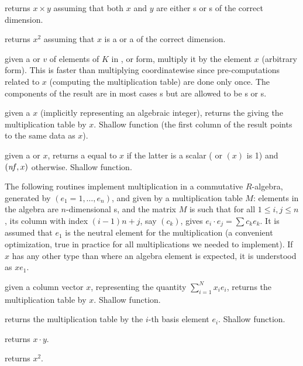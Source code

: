  returns $x\times y$ assuming
that both $x$ and $y$ are either s or s of the correct
dimension.

 returns $x^2$ assuming that $x$ is a 
or a  of the correct dimension.

 given a  or 
$v$ of elements of $K$ in ,  or  form, multiply
it by the element $x$ (arbitrary form). This is faster than multiplying
coordinatewise since pre-computations related to $x$ (computing the
multiplication table) are done only once. The components of the result
are in most cases s but are allowed to be s or s.

 given a  $x$ (implicitly
representing an algebraic integer), returns the  giving the
multiplication table by $x$. Shallow function (the first column of the result
points to the same data as $x$).

 given a  or 
$x$, returns a  equal to $x$ if the latter is a scalar
( or $(x)$ is 1) and
$(\hbox{\it nf\/},x)$ otherwise. Shallow function.


The following routines implement multiplication in a commutative $R$-algebra,
generated by $(e_1 = 1,\dots, e_n)$, and given by a multiplication table $M$:
elements in the algebra are $n$-dimensional s, and the matrix
$M$ is such that for all $1\leq i,j\leq n$, its column with index $(i-1)n +
j$, say $(c_k)$, gives $e_i\cdot e_j = \sum c_k e_k$. It is assumed that
$e_1$ is the neutral element for the multiplication (a convenient
optimization, true in practice for all multiplications we needed to implement).
If $x$ has any other type than  where an algebra element is
expected, it is understood as $x e_1$.

 given a column vector $x$, representing
the quantity $\sum_{i=1}^N x_i e_i$, returns the multiplication table by $x$.
Shallow function.

 returns the multiplication table
by the $i$-th basis element $e_i$. Shallow function.

 returns $x\cdot y$.

 returns $x^2$.

